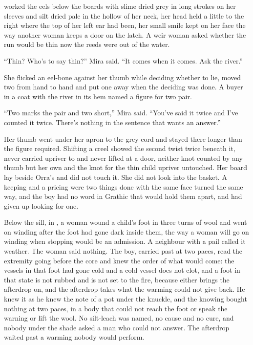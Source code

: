  worked the eels below the boards with slime dried grey in long strokes on her sleeves and silt dried pale in the hollow of her neck, her head held a little to the right where the top of her left ear had been, her small smile kept on her face the way another woman keeps a door on the latch. A weir woman asked whether the run would be thin now the reeds were out of the water.

“Thin? Who's to say thin?” Mira said. “It comes when it comes. Ask the river.”

She flicked an eel-bone against her thumb while deciding whether to lie, moved two from hand to hand and put one away when the deciding was done. A buyer in a coat with the river in its hem named a figure for two pair.

“Two marks the pair and two short,” Mira said. “You've said it twice and I've counted it twice. There's nothing in the sentence that wants an answer.”

Her thumb went under her apron to the grey cord and stayed there longer than the figure required. Shifting a creel showed the second twist twice beneath it, never carried upriver to  and never lifted at a door, neither knot counted by any thumb but her own and the knot for the thin child upriver untouched. Her board lay beside Orra's and did not touch it. She did not look into the basket. A keeping and a pricing were two things done with the same face turned the same way, and the boy had no word in Grathic that would hold them apart, and had given up looking for one.

\scenebreak

Below the sill, in , a woman wound a child's foot in three turns of wool and went on winding after the foot had gone dark inside them, the way a woman will go on winding when stopping would be an admission. A neighbour with a pail called it weather. The woman said nothing. The boy, carried past at two paces, read the extremity going before the core and knew the order of what would come: the vessels in that foot had gone cold and a cold vessel does not clot, and a foot in that state is not rubbed and is not set to the fire, because either brings the afterdrop on, and the afterdrop takes what the warming could not give back. He knew it as he knew the note of a pot under the knuckle, and the knowing bought nothing at two paces, in a body that could not reach the foot or speak the warning or lift the wool. No silt-leach was named, no cause and no cure, and nobody under the shade asked a man who could not answer. The afterdrop waited past a warming nobody would perform.

